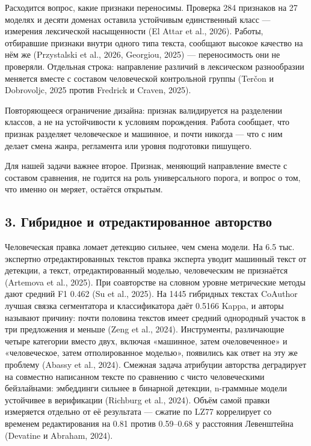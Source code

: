 \documentclass[11pt,a4paper]{article}
\renewcommand{\_}{\textunderscore\allowbreak}
\begin{document}
Расходится вопрос, какие признаки переносимы. Проверка 284 признаков на 27
моделях и десяти доменах оставила устойчивым единственный класс — измерения
лексической насыщенности (El Attar et al., 2026). Работы, отбиравшие признаки внутри одного типа
текста, сообщают высокое качество на нём же (Przystalski et al., 2026, Georgiou, 2025) — переносимость они не
проверяли. Отдельная строка: направление различий в лексическом разнообразии
меняется вместе с составом человеческой контрольной группы (Ter\v{c}on и Dobrovoljc, 2025 против Fredrick и Craven, 2025).

Повторяющееся ограничение дизайна: признак валидируется на разделении классов, а
не на устойчивости к условиям порождения. Работа сообщает, что признак разделяет
человеческое и машинное, и почти никогда — что с ним делает смена жанра,
регламента или уровня подготовки пишущего.

Для нашей задачи важнее второе. Признак, меняющий направление вместе с составом
сравнения, не годится на роль универсального порога, и вопрос о том, что именно
он меряет, остаётся открытым.

\subsection{3. Гибридное и отредактированное авторство}

Человеческая правка ломает детекцию сильнее, чем смена модели. На 6.5 тыс.
экспертно отредактированных текстов правка эксперта уводит машинный текст от
детекции, а текст, отредактированный моделью, человеческим не признаётся (Artemova et al., 2025).
При соавторстве на словном уровне метрические методы дают средний F1 0.462
(Su et al., 2025). На 1445 гибридных текстах CoAuthor лучшая связка сегментатора и
классификатора даёт 0.5166 Kappa, и авторы называют причину: почти половина
текстов имеет средний однородный участок в три предложения и меньше (Zeng et al., 2024).
Инструменты, различающие четыре категории вместо двух, включая «машинное, затем
очеловеченное» и «человеческое, затем отполированное моделью», появились как
ответ на эту же проблему (Abassy et al., 2024). Смежная задача атрибуции авторства деградирует
на совместно написанном тексте по сравнению с чисто человеческими бейзлайнами:
эмбеддинги сильнее в бинарной детекции, n-граммные модели устойчивее в
верификации (Richburg et al., 2024). Объём самой правки измеряется отдельно от её результата —
сжатие по LZ77 коррелирует со временем редактирования на 0.81 против 0.59–0.68 у
расстояния Левенштейна (Devatine и Abraham, 2024).
\end{document}
